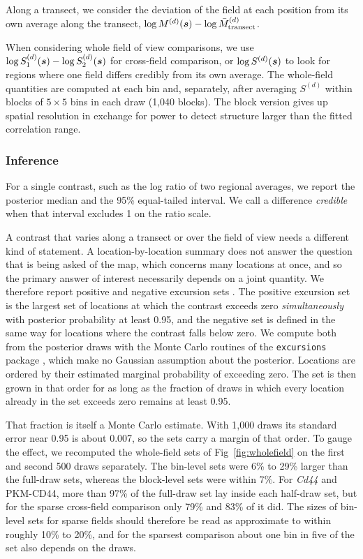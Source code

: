 \documentclass[10pt,letterpaper]{article}
\begin{document}
Along a transect, we consider the deviation of the field at each position from its own average along the transect, $\log M^{(d)}(\mbox{\boldmath $s$}) - \log \bar{M}^{(d)}_{\text{transect}}$.

When considering whole field of view comparisons, we use $\log S_1^{(d)}(\mbox{\boldmath $s$}) - \log S_2^{(d)}(\mbox{\boldmath $s$})$ for cross-field comparison, or $\log S^{(d)}(\mbox{\boldmath $s$})$ to look for regions where one field differs credibly from its own average. The whole-field quantities are computed at each bin and, separately, after averaging $S^{(d)}$ within blocks of $5 \times 5$ bins in each draw (1,040 blocks). The block version gives up spatial resolution in exchange for power to detect structure larger than the fitted correlation range.

\subsubsection*{Inference}


For a single contrast, such as the log ratio of two regional averages, we report the posterior median and the 95\% equal-tailed interval. We call a difference \textit{credible} when that interval excludes 1 on the ratio scale.

A contrast that varies along a transect or over the field of view needs a different kind of statement. A location-by-location summary does not answer the question that is being asked of the map, which concerns many locations at once, and so the primary answer of interest necessarily depends on a joint quantity. We therefore report positive and negative excursion sets \cite{bolin2015excursion}. The positive excursion set is the largest set of locations at which the contrast exceeds zero \emph{simultaneously} with posterior probability at least 0.95, and the negative set is defined in the same way for locations where the contrast falls below zero. We compute both from the posterior draws with the Monte Carlo routines of the \texttt{excursions} package \cite{bolin2018excursions}, which make no Gaussian assumption about the posterior. Locations are ordered by their estimated marginal probability of exceeding zero. The set is then grown in that order for as long as the fraction of draws in which every location already in the set exceeds zero remains at least 0.95.

That fraction is itself a Monte Carlo estimate. With 1,000 draws its standard error near 0.95 is about 0.007, so the sets carry a margin of that order. To gauge the effect, we recomputed the whole-field sets of Fig~\ref{fig:wholefield} on the first and second 500 draws separately. The bin-level sets were 6\% to 29\% larger than the full-draw sets, whereas the block-level sets were within 7\%. For \textit{Cd44} and PKM-CD44, more than 97\% of the full-draw set lay inside each half-draw set, but for the sparse cross-field comparison only 79\% and 83\% of it did. The sizes of bin-level sets for sparse fields should therefore be read as approximate to within roughly 10\% to 20\%, and for the sparsest comparison about one bin in five of the set also depends on the draws.
\end{document}
